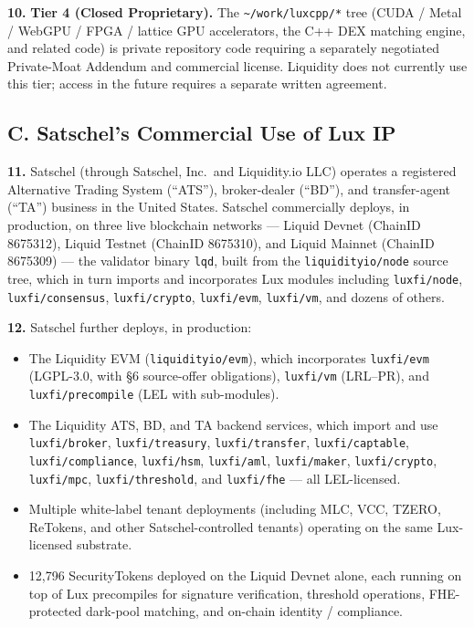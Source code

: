 \documentclass[11pt,letterpaper]{article}
\begin{document}
\textbf{10.} \textbf{Tier 4 (Closed Proprietary).} The
\texttt{\textasciitilde/work/luxcpp/*} tree (CUDA / Metal / WebGPU /
FPGA / lattice GPU accelerators, the C++ DEX matching engine, and
related code) is private repository code requiring a separately
negotiated Private-Moat Addendum and commercial license. Liquidity
does not currently use this tier; access in the future requires a
separate written agreement.

\subsection*{C. Satschel's Commercial Use of Lux IP}

\textbf{11.} Satschel (through Satschel, Inc.\ and Liquidity.io LLC)
operates a registered Alternative Trading System (``ATS''),
broker-dealer (``BD''), and transfer-agent (``TA'') business in the
United States. Satschel commercially deploys, in production, on three
live blockchain networks --- Liquid Devnet (ChainID 8675312), Liquid
Testnet (ChainID 8675310), and Liquid Mainnet (ChainID 8675309) ---
the validator binary \texttt{lqd}, built from the
\texttt{liquidityio/node} source tree, which in turn imports and
incorporates Lux modules including \texttt{luxfi/node},
\texttt{luxfi/consensus}, \texttt{luxfi/crypto}, \texttt{luxfi/evm},
\texttt{luxfi/vm}, and dozens of others.

\textbf{12.} Satschel further deploys, in production:

\begin{itemize}[leftmargin=2em,itemsep=0.1em]
\item The Liquidity EVM (\texttt{liquidityio/evm}), which incorporates
\texttt{luxfi/evm} (LGPL-3.0, with \S 6 source-offer obligations),
\texttt{luxfi/vm} (LRL--PR), and \texttt{luxfi/precompile} (LEL with
sub-modules).
\item The Liquidity ATS, BD, and TA backend services, which import
and use \texttt{luxfi/broker}, \texttt{luxfi/treasury},
\texttt{luxfi/transfer}, \texttt{luxfi/captable},
\texttt{luxfi/compliance}, \texttt{luxfi/hsm}, \texttt{luxfi/aml},
\texttt{luxfi/maker}, \texttt{luxfi/crypto}, \texttt{luxfi/mpc},
\texttt{luxfi/threshold}, and \texttt{luxfi/fhe} --- all LEL-licensed.
\item Multiple white-label tenant deployments (including MLC, VCC,
TZERO, ReTokens, and other Satschel-controlled tenants) operating on
the same Lux-licensed substrate.
\item 12,796 SecurityTokens deployed on the Liquid Devnet alone,
each running on top of Lux precompiles for signature verification,
threshold operations, FHE-protected dark-pool matching, and on-chain
identity / compliance.
\end{itemize}
\end{document}
